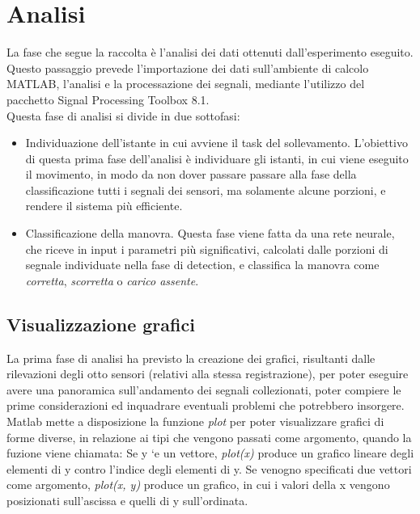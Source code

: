 \documentclass[a4paper]{article}
\begin{document}
\section{Analisi}
La fase che segue la raccolta è l'analisi dei dati ottenuti dall'esperimento eseguito. Questo passaggio prevede l'importazione dei dati sull'ambiente di calcolo MATLAB, l'analisi e la processazione dei segnali, mediante l'utilizzo  del pacchetto Signal Processing Toolbox 8.1. \\
Questa fase di analisi si divide in due sottofasi:
\begin {itemize}
\item Individuazione dell'istante in cui avviene il task del sollevamento. L'obiettivo di questa prima fase dell'analisi è individuare gli istanti, in cui viene eseguito il movimento, in modo da non dover passare  passare alla fase della classificazione tutti i segnali dei sensori, ma solamente alcune porzioni, e rendere il sistema più efficiente.
\item Classificazione della manovra. Questa fase viene fatta da una rete neurale, che riceve in input i parametri più significativi, calcolati dalle porzioni di segnale individuate nella fase di detection, e classifica la manovra come \textit{corretta}, \textit{scorretta} o \textit{carico assente}.
\end{itemize}

\subsection{Visualizzazione grafici}
La prima fase di analisi ha previsto la creazione dei grafici, risultanti dalle rilevazioni degli otto sensori (relativi alla stessa registrazione), per poter eseguire avere una panoramica sull'andamento dei segnali collezionati, poter compiere le prime considerazioni ed inquadrare eventuali problemi che potrebbero insorgere.\\
Matlab mette a disposizione la funzione \textit{plot} per poter visualizzare grafici di forme diverse, in relazione ai tipi che vengono passati come argomento, quando la fuzione viene chiamata:  Se y `e un vettore, \textit{plot(x)} produce un grafico lineare degli elementi di y contro l’indice degli elementi di y.  Se venogno specificati due vettori come argomento,\textit{ plot(x, y) } produce un grafico, in cui i valori della x vengono posizionati sull'ascissa e quelli di y sull'ordinata. \\
\end{document}
